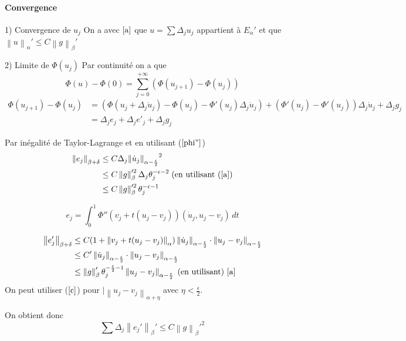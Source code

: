 \documentclass[11pt,a4paper]{article}
\begin{document}
\paragraph{Convergence}

1) Convergence de $u_j$
On a avec $\ref{a}$ que $u = \sum \Delta_j u_j$ appartient à $E_\alpha'$ et que $\left\|u \right\|_\alpha' \leq C \left\|g \right\|_\beta'$

2) Limite de $\Phi(u_j)$
Par continuité on a que 
\[
\Phi(u) - \Phi(0) = \sum^{+\infty}_{j=0} (\Phi(u_{j+1}) - \Phi(u_{j})) 
\]
\[
\begin{aligned}
\Phi(u_{j+1}) - \Phi(u_j) &= (\Phi(u_j + \Delta_j \dot{u}_j) - \Phi(u_j) - \Phi'(u_j)\Delta_j \dot{u}_j) + (\Phi'(u_j) - \Phi'(u_j))\Delta_j \dot{u}_j + \Delta_j g_j \\
&= \Delta_j e_j + \Delta_j e'_j + \Delta_j g_j
\end{aligned}
\]

Par inégalité de Taylor-Lagrange et en utilisant ($\ref{phi''}$)
\[
\begin{aligned}
\left\|e_j \right\|_{\beta + \delta} &\leq C \Delta_j {\left\|\dot{u}_j \right\|_{\alpha - \frac{\epsilon}{2}}}^2 \\
&\leq C \left\|g \right\|_\beta'^2 \Delta_j \theta_j^{-\epsilon-2} \; \text{(en utilisant } (\ref{a}) \\
&\leq C \left\|g \right\|_\beta'^2 \theta_j^{-\epsilon-1}
\end{aligned}
\]

\[
e_j = \int^1_0 \Phi''(v_j + t(u_j - v_j))(\dot{u}_j, u_j - v_j) \, dt
\]

\[
\begin{aligned}
\left\|e'_j \right\|_{\beta + \delta} &\leq C (1 + \left\|v_j + t(u_j - v_j) \right\|_\alpha) \left\|\dot{u}_j \right\|_{\alpha - \frac{\epsilon}{2}} \cdot \left\|u_j - v_j\right\|_{\alpha - \frac{\epsilon}{2}} \\
&\leq C' \left\|\dot{u}_j \right\|_{\alpha - \frac{\epsilon}{2}} \cdot \left\|u_j - v_j\right\|_{\alpha - \frac{\epsilon}{2}} \\
&\leq \left\|g \right\|_\beta' \theta_j^{-\frac{\epsilon}{2}-1} \left\|u_j - v_j\right\|_{\alpha - \frac{\epsilon}{2}} \; \text{(en utilisant)} \ \ref{a}
\end{aligned}
\]
On peut utiliser ($\ref{c}$) pour $|\left\|u_j - v_j\right\|_{\alpha + \eta}$ avec $\eta < \frac{\epsilon}{2}$.

On obtient donc 
\[ 
\sum \Delta_j \left\|e_j'\right\|_\beta' \leq C \left\|g \right\|_\beta'^2 
\]
\end{document}

